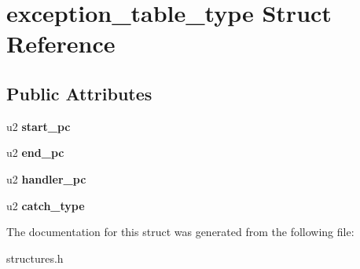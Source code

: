 \hypertarget{structexception__table__type}{}\section{exception\+\_\+table\+\_\+type Struct Reference}
\label{structexception__table__type}
\subsection*{Public Attributes}
\begin{DoxyCompactItemize}
\item 
u2 {\bfseries start\+\_\+pc}\hypertarget{structexception__table__type_a71cf8eaa3d06b89818100df6405b266d}{}\label{structexception__table__type_a71cf8eaa3d06b89818100df6405b266d}

\item 
u2 {\bfseries end\+\_\+pc}\hypertarget{structexception__table__type_a796565865a227dc76b0dd7c78e3f8424}{}\label{structexception__table__type_a796565865a227dc76b0dd7c78e3f8424}

\item 
u2 {\bfseries handler\+\_\+pc}\hypertarget{structexception__table__type_af1b56d902850a41f63b7271029946759}{}\label{structexception__table__type_af1b56d902850a41f63b7271029946759}

\item 
u2 {\bfseries catch\+\_\+type}\hypertarget{structexception__table__type_a663fa7b2d1a468b29913fd92e006a5dc}{}\label{structexception__table__type_a663fa7b2d1a468b29913fd92e006a5dc}

\end{DoxyCompactItemize}


The documentation for this struct was generated from the following file\+:\begin{DoxyCompactItemize}
\item 
structures.\+h\end{DoxyCompactItemize}
